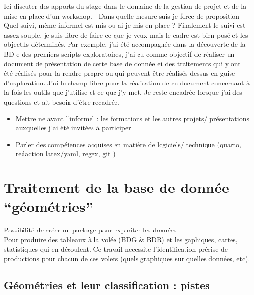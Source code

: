 \documentclass[
  a4paper,
]{scrbook}
\providecommand{\tightlist}{%
  \setlength{\itemsep}{0pt}\setlength{\parskip}{0pt}}\usepackage{longtable,booktabs,array}
\begin{document}
Ici discuter des apports du stage dans le domaine de la gestion de
projet et de la mise en place d'un workshop. - Dans quelle mesure
suis-je force de proposition - Quel suivi, même informel est mis ou
ai-je mis en place ? Finalement le suivi est assez souple, je suis libre
de faire ce que je veux mais le cadre est bien posé et les objectifs
déterminés. Par exemple, j'ai été accompagnée dans la découverte de la
BD e des premiers scripts exploratoires, j'ai eu comme objectif de
réaliser un document de présentation de cette base de donnée et des
traitements qui y ont été réalisés pour la rendre propre ou qui peuvent
être réalisés dessus en guise d'exploration. J'ai le champ libre pour la
réalisation de ce document concernant à la fois les outils que j'utilise
et ce que j'y met. Je reste encadrée lorsque j'ai des questions et ait
besoin d'être recadrée.

\begin{itemize}
\tightlist
\item
  Mettre ne avant l'informel : les formations et les autres projets/
  présentations auxquelles j'ai été invitées à participer
\item
  Parler des compétences acquises en matière de logiciels/ technique
  (quarto, redaction latex/yaml, regex, git )
\end{itemize}

\hypertarget{traitement-de-la-base-de-donnuxe9e-guxe9omuxe9tries}{%
\section{Traitement de la base de donnée
``géométries''}\label{traitement-de-la-base-de-donnuxe9e-guxe9omuxe9tries}}

Possibilité de créer un package pour exploiter les données.\\
Pour produire des tableaux à la volée (BDG \& BDR) et les gaphiques,
cartes, statistiques qui en découlent. Ce travail necessite
l'identification précise de productions pour chacun de ces volets (quels
graphiques sur quelles données, etc).

\hypertarget{guxe9omuxe9tries-et-leur-classification-pistes}{%
\subsection{Géométries et leur classification :
pistes}\label{guxe9omuxe9tries-et-leur-classification-pistes}}
\end{document}
